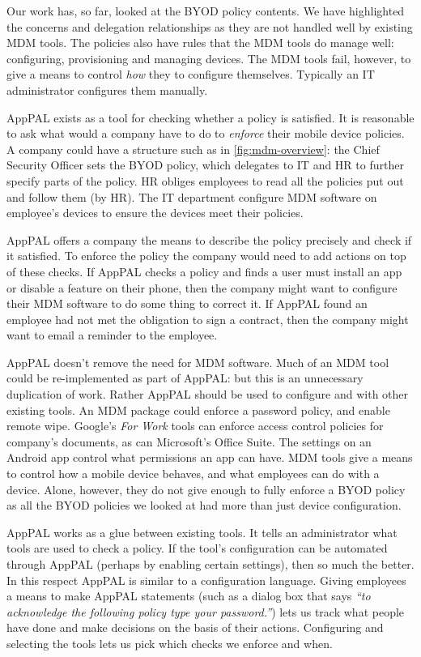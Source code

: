 \documentclass[thesis.tex]{subfiles}
\begin{document}
Our work has, so far, looked at the BYOD policy contents. We have highlighted
the concerns and delegation relationships as they are not handled well by
existing \ac{MDM} tools. The policies also have rules that the \ac{MDM} tools do
manage well: configuring, provisioning and managing devices. The \ac{MDM} tools
fail, however, to give a means to control \emph{how} they to configure
themselves. Typically an IT administrator configures them manually.

AppPAL exists as a tool for checking whether a policy is satisfied.
It is reasonable to ask what would a company have to do to
\emph{enforce} their mobile device policies. A company could have a
structure such as in \autoref{fig:mdm-overview}: the Chief Security
Officer sets the BYOD policy, which delegates to IT and HR to further
specify parts of the policy.  HR obliges employees to read all the
policies put out and follow them (by HR).  The IT department configure \ac{MDM} software on
employee's devices to ensure the devices meet their policies.

AppPAL offers a company the means to describe the policy precisely and check if
it satisfied. To enforce the policy the company would need to add actions on top
of these checks. If AppPAL checks a policy and finds a user must install an app
or disable a feature on their phone, then the company might want to configure
their \ac{MDM} software to do some thing to correct it. If AppPAL found an
employee had not met the obligation to sign a contract, then the company might
want to email a reminder to the employee.

AppPAL doesn't remove the need for \ac{MDM} software. Much of an \ac{MDM} tool
could be re-implemented as part of AppPAL: but this is an unnecessary
duplication of work. Rather AppPAL should be used to configure and with other
existing tools. An \ac{MDM} package could enforce a password policy, and enable
remote wipe. Google's \emph{For Work} tools can enforce access control policies
for company's documents, as can Microsoft's Office Suite. The settings on an
Android app control what permissions an app can have. \ac{MDM} tools give a
means to control how a mobile device behaves, and what employees can do with a
device. Alone, however, they do not give enough to fully enforce a \ac{BYOD}
policy as all the \ac{BYOD} policies we looked at had more than just device
configuration.

AppPAL works as a glue between existing tools. It tells an administrator what
tools are used to check a policy. If the tool's configuration can be automated
through AppPAL (perhaps by enabling certain settings), then so much the better.
In this respect AppPAL is similar to a configuration language. Giving employees
a means to make AppPAL statements (such as a dialog box that says \emph{``to
acknowledge the following policy type your password.''}) lets us track what
people have done and make decisions on the basis of their actions. Configuring
and selecting the tools lets us pick which checks we enforce and when.

%  
\end{document}
